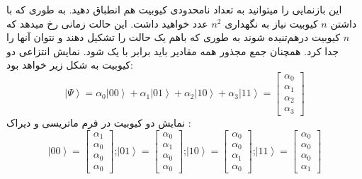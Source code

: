 این بازنمایی را میتوانید به تعداد نامحدودی کیوبیت هم انطباق دهید. به طوری که با داشتن $n$ کیوبیت نیاز به نگهداری $n^{2}$ عدد خواهید داشت. این حالت زمانی رخ میدهد که $n$ کیوبیت درهم‌تنیده
 شوند به طوری که باهم یک حالت را تشکیل دهند و نتوان آنها را جدا کرد. 
\cite{fundamentalsandapplications}
همچنان جمع مجذور همه مقادیر باید برابر با یک شود. نمایش انتزاعی دو کیوبیت به شکل زیر خواهد بود:
\begin{equation}
\left|\Psi\right\rangle = \alpha_{0}\left|00\right\rangle +  \alpha_{1}\left|01\right\rangle +  \alpha_{2}\left|10\right\rangle +  \alpha_{3}\left|11\right\rangle = \begin{bmatrix}
 \alpha_{0}
\\
 \alpha_{1}
\\
 \alpha_{2}
\\
 \alpha_{3}
\end{bmatrix}
\end{equation}
نمایش دو کیوبیت در فرم ماتریسی و دیراک
:
\begin{equation}
\left|00\right\rangle  = \begin{bmatrix}
 \alpha_{1}
\\
 \alpha_{0}
\\
 \alpha_{0}
\\
 \alpha_{0}
\end{bmatrix}
\text{;}
\left|01\right\rangle  = \begin{bmatrix}
 \alpha_{0}
\\
 \alpha_{1}
\\
 \alpha_{0}
\\
 \alpha_{0}
\end{bmatrix}
\text{;}
\left|10\right\rangle  = \begin{bmatrix}
 \alpha_{0}
\\
 \alpha_{0}
\\
 \alpha_{1}
\\
 \alpha_{0}
\end{bmatrix}
\text{;}
\left|11\right\rangle  = \begin{bmatrix}
 \alpha_{0}
\\
 \alpha_{0}
\\
 \alpha_{0}
\\
 \alpha_{1}
\end{bmatrix}
\end{equation}


